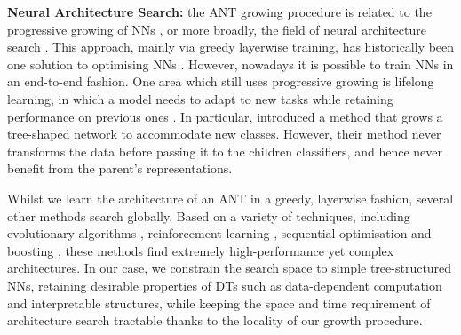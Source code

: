 
\textbf{Neural Architecture Search:} the ANT growing procedure is related to the progressive growing of NNs \citep{fahlman1990cascade,hinton2006fast,xiao2014errordriven,chen2016net2net,srivastava2015highway,lee2017lifelong,cai2018efficient,irsoy2018continuously}, or more broadly, the field of neural architecture search \citep{zoph2016neural,brock2017smash,cortes2017adanet}. This approach, mainly via greedy layerwise training, has historically been one solution to optimising NNs \citep{fahlman1990cascade,hinton2006fast}. However, nowadays it is possible to train NNs in an end-to-end fashion. One area which still uses progressive growing is lifelong learning, in which a model needs to adapt to new tasks while retaining performance on previous ones \citep{xiao2014errordriven,lee2017lifelong}. In particular, \citep{xiao2014errordriven} introduced a method that grows a tree-shaped network to accommodate new classes. However, their method never transforms the data before passing it to the children classifiers, and hence never benefit from the parent's representations. 

Whilst we learn the architecture of an ANT in a greedy, layerwise fashion, several other methods search globally. Based on a variety of techniques, including evolutionary algorithms \citep{stanley2002evolving,real2017large}, reinforcement learning \citep{zoph2016neural}, sequential optimisation \citep{liu2017progressive} and boosting \citep{cortes2017adanet}, these methods find extremely high-performance yet complex architectures. In our case, we constrain the search space to simple tree-structured NNs, retaining desirable properties of DTs such as data-dependent computation and interpretable structures, while keeping the space and time requirement of architecture search tractable thanks to the locality of our growth procedure.

